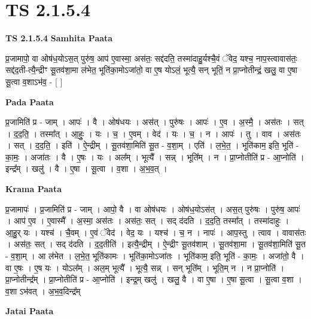 \documentclass[17pt]{extarticle}
\begin{document}
\section*{ TS 2.1.5.4 }

\textbf{TS 2.1.5.4 } \newline
\textbf{Samhita Paata} \newline

प्र॒जामापो॒ वा ओष॑ध॒योऽस॒त् पुरु॑ष॒ आप॑ ए॒वास्मा॒ अस॑तः॒ सद्द॑दति॒ तस्मा॑दाहु॒र्यश्चै॒वं ॅवेद॒ यश्च॒ नाप॒स्त्वावास॑तः॒ सद्द॑द॒ती-त्यै॒न्द्रीꣳ सू॒तव॑शा॒मा ल॑भेत॒ भूति॑का॒मोऽजा॑तो॒ वा ए॒ष योऽलं॒ भूत्यै॒ सन् भूतिं॒ न प्रा॒प्नोतीन्द्रं॒ खलु॒ वा ए॒षा सू॒त्वा व॒शाऽभ॑व॒ - [  ] \newline

\textbf{Pada Paata} \newline

प्र॒जामिति॑ प्र - जाम् । आपः॑ । वै । ओष॑धयः । अस॑त् । पुरु॑षः । आपः॑ । ए॒व । अ॒स्मै॒ । अस॑तः । सत् । द॒द॒ति॒ । तस्मा᳚त् । आ॒हुः॒ । यः । च॒ । ए॒वम् । वेद॑ । यः । च॒ । न । आपः॑ । तु । वाव । अस॑तः । सत् । द॒द॒ति॒ । इति॑ । ऐ॒न्द्रीम् । सू॒तव॑शा॒मिति॑ सू॒त - व॒शा॒म् । एति॑ । ल॒भे॒त॒ । भूति॑काम॒ इति॒ भूति॑ - का॒मः॒ । अजा॑तः । वै । ए॒षः । यः । अल᳚म् । भूत्यै᳚ । सन्न् । भूति᳚म् । न । प्रा॒प्नोतीति॑ प्र - आ॒प्नोति॑ । इन्द्र᳚म् । खलु॑ । वै । ए॒षा । सू॒त्वा । व॒शा । अ॒भ॒व॒त् ।  \newline


\textbf{Krama Paata} \newline

प्र॒जामापः॑ । प्र॒जामिति॑ प्र - जाम् । आपो॒ वै । वा ओष॑धयः । ओष॑ध॒योऽस॑त् । अस॒त् पुरु॑षः । पुरु॑ष॒ आपः॑ । आप॑ ए॒व । ए॒वास्मै᳚ । अ॒स्मा॒ अस॑तः । अस॑तः॒ सत् । सद् द॑दति । द॒द॒ति॒ तस्मा᳚त् । तस्मा॑दाहुः । आ॒हु॒र् यः । यश्च॑ । चै॒वम् । ए॒वं ॅवेद॑ । वेद॒ यः । यश्च॑ । च॒ न । नापः॑ । आप॒स्तु । त्वाव । वावास॑तः । अस॑तः॒ सत् । सद् द॑दति । द॒द॒तीति॑ । इत्यै॒न्द्रीम् । ऐ॒न्द्रीꣳ सू॒तव॑शाम् । सू॒तव॑शा॒मा । सू॒तव॑शा॒मिति॑ सू॒त - व॒शा॒म् । आ ल॑भेत । ल॒भे॒त॒ भूति॑कामः । भूति॑का॒मोऽजा॑तः । भूति॑काम॒ इति॒ भूति॑ - का॒मः॒ । अजा॑तो॒ वै । वा ए॒षः । ए॒ष यः । योऽल᳚म् । अल॒म् भूत्यै᳚ । भूत्यै॒ सन्न् । सन् भूति᳚म् । भूति॒म् न । न प्रा॒प्नोति॑ । प्रा॒प्नोतीन्द्र᳚म् । प्रा॒प्नोतीति॑ प्र - आ॒प्नोति॑ । इन्द्र॒म् खलु॑ । खलु॒ वै । वा ए॒षा । ए॒षा सू॒त्वा । सू॒त्वा व॒शा । व॒शा ऽभ॑वत् । अ॒भ॒व॒दिन्द्र᳚म् \newline

\textbf{Jatai Paata} \newline
\end{document}
